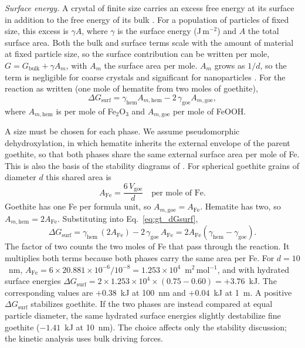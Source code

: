 \textit{Surface energy.} A crystal of finite size carries an excess free energy at its
surface in addition to the free energy of its bulk \citep{gibbs1878}. For a population of
particles of fixed size, this excess is $\gamma A$, where $\gamma$ is the surface energy
(J\,m$^{-2}$) and $A$ the total surface area. Both the bulk and surface terms scale with the
amount of material at fixed particle size, so the surface contribution can be written per mole,
$G = G_{\mathrm{bulk}} + \gamma A_m$, with $A_m$ the surface area per mole. $A_m$ grows as $1/d$,
so the term is negligible for coarse crystals and significant for nanoparticles
\citep{navrotsky2008}. For the reaction as written (one mole of hematite from two moles of
goethite),
\begin{equation}
  \Delta G_{\mathrm{surf}} = \gamma_{\mathrm{hem}} A_{m,\mathrm{hem}} - 2\,\gamma_{\mathrm{goe}} A_{m,\mathrm{goe}},
  \label{eq:gt_dGsurf}
\end{equation}
where $A_{m,\mathrm{hem}}$ is per mole of Fe$_2$O$_3$ and $A_{m,\mathrm{goe}}$ per mole of FeOOH.

A size must be chosen for each phase. We assume pseudomorphic dehydroxylation, in which hematite
inherits the external envelope of the parent goethite, so that both phases share the same
external surface area per mole of Fe. This is also the basis of the stability diagrams of
\citet{navrotsky2008}. For spherical goethite grains of diameter $d$ this shared area is
\begin{equation}
  A_{\mathrm{Fe}} = \frac{6\,V_{\mathrm{goe}}}{d}\quad\text{per mole of Fe}.
\end{equation}
Goethite has one Fe per formula unit, so $A_{m,\mathrm{goe}} = A_{\mathrm{Fe}}$. Hematite has two,
so $A_{m,\mathrm{hem}} = 2A_{\mathrm{Fe}}$. Substituting into Eq.~\eqref{eq:gt_dGsurf},
\begin{equation}
  \Delta G_{\mathrm{surf}} = \gamma_{\mathrm{hem}}\,(2A_{\mathrm{Fe}}) - 2\,\gamma_{\mathrm{goe}}\,A_{\mathrm{Fe}}
  = 2A_{\mathrm{Fe}}\left(\gamma_{\mathrm{hem}} - \gamma_{\mathrm{goe}}\right).
  \label{eq:gt_equalarea}
\end{equation}
The factor of two counts the two moles of Fe that pass through the reaction. It multiplies both
terms because both phases carry the same area per Fe. For $d=10$~nm,
$A_{\mathrm{Fe}} = 6\times20.881\times10^{-6}/10^{-8} = 1.253\times10^{4}$~m$^2$\,mol$^{-1}$, and
with hydrated surface energies
$\Delta G_{\mathrm{surf}} = 2\times1.253\times10^{4}\times(0.75-0.60) = +3.76$~kJ.
The corresponding values are $+0.38$~kJ at 100~nm and $+0.04$~kJ at 1~\textmu m. A positive
$\Delta G_{\mathrm{surf}}$ stabilizes goethite. If the two phases are instead compared at equal
particle diameter, the same hydrated surface energies slightly destabilize fine goethite
($-1.41$~kJ at 10~nm). The choice affects only the stability discussion; the kinetic analysis uses
bulk driving forces.

